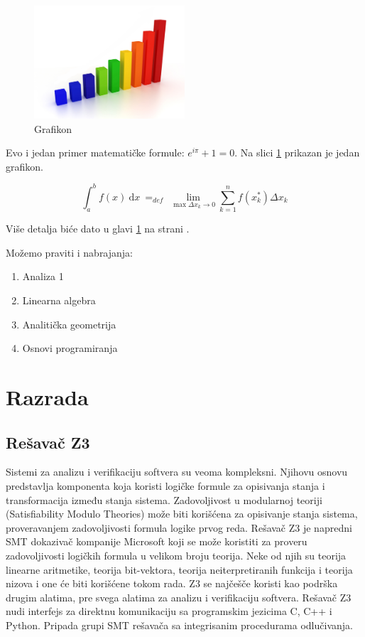 \documentclass[12pt,oneside]{memoir}
\begin{document}
\begin{figure}[!ht]
  \centering
  \label{fig:grafikon}
  \includegraphics[width=0.5\textwidth]{graph.png}
  \caption{Grafikon}
\end{figure}


Evo i jedan primer matematičke formule: $e^{i\pi} + 1 = 0$. 
Na slici \ref{fig:grafikon} prikazan je jedan grafikon.

$$
\int_a^b f(x)\ \mathrm{d}x \ =_{def}\ \lim_{\max{\Delta x_k \rightarrow 0}} \sum_{k=1}^n f(x_k^*)\Delta x_k
$$

Više detalja biće dato u glavi \ref{chp:razrada} na strani \pageref{chp:razrada}.

Možemo praviti i nabrajanja:
\begin{enumerate}
\item Analiza 1
\item Linearna algebra
\item Analitička geometrija
\item Osnovi programiranja
\end{enumerate}

\pangrami

\chapter{Razrada}
\label{chp:razrada}
\section{Rešavač Z3}
Sistemi za analizu i verifikaciju softvera su veoma kompleksni. Njihovu osnovu predstavlja komponenta koja koristi logičke formule za opisivanja stanja i transformacija između stanja sistema. Zadovoljivost u modularnoj teoriji (Satisfiability Modulo Theories) može biti korišćena za opisivanje stanja sistema, proveravanjem zadovoljivosti formula logike prvog reda. Rešavač Z3 je napredni SMT dokazivač kompanije Microsoft koji se može koristiti za proveru zadovoljivosti logičkih formula u velikom broju teorija. Neke od njih su teorija linearne aritmetike, teorija bit-vektora, teorija neiterpretiranih funkcija i teorija nizova i one će biti korišćene tokom rada. Z3 se najčešče koristi kao podrška drugim alatima, pre svega alatima za analizu i verifikaciju softvera. Rešavač Z3 nudi interfejs za direktnu komunikaciju sa programskim jezicima C, C++ i Python. Pripada grupi SMT rešavača sa integrisanim procedurama odlučivanja.
\\
\end{document}
